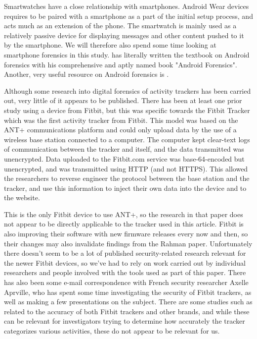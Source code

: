 \documentclass[a4paper,11pt,dvips]{article}
\begin{document}
Smartwatches have a close relationship with smartphones. Android Wear devices requires to be paired with a smartphone as a part of the initial setup process, and acts much as an extension of the phone. The smartwatch is mainly used as a relatively passive device for displaying messages and other content pushed to it by the smartphone. We will therefore also spend some time looking at smartphone forensics in this study. \cite{hoog2011android} has literally written the textbook on Android forensics with his comprehensive and aptly named book "Android Forensics". Another, very useful resource on Android forensics is \cite{vidas2011toward}.

Although some research into digital forensics of activity trackers has been carried out, very little of it appears to be published. There has been at least one prior study using a device from Fitbit, but this was specific towards the Fitbit Tracker which was the first activity tracker from Fitbit. This model was based on the ANT+ communications platform and could only upload data by the use of a wireless base station connected to a computer. The computer kept clear-text logs of communication between the tracker and itself, and the data transmitted was unencrypted. Data uploaded to the Fitbit.com service was base-64-encoded but unencrypted, and was transmitted using HTTP (and not HTTPS). This allowed the researchers to reverse engineer the protocol between the base station and the tracker, and use this information to inject their own data into the device and to the website. \citep{rahman2013fit}

This is the only Fitbit device to use ANT+, so the research in that paper does not appear to be directly applicable to the tracker used in this article. Fitbit is also improving their software with new firmware releases every now and then, so their changes may also invalidate findings from the Rahman paper. Unfortunately there doesn’t seem to be a lot of published security-related research relevant for the newer Fitbit devices, so we’ve had to rely on work carried out by individual researchers and people involved with the tools used as part of this paper. There has also been some e-mail correspondence with French security researcher Axelle Aprville, who has spent some time investigating the security of Fitbit trackers, as well as making a few presentations on the subject. There are some studies such as \cite{lee2014validity} related to the accuracy of both Fitbit trackers and other brands, and while these can be relevant for investigators trying to determine how accurately the tracker categorizes various activities, these do not appear to be relevant for us.
\end{document}
